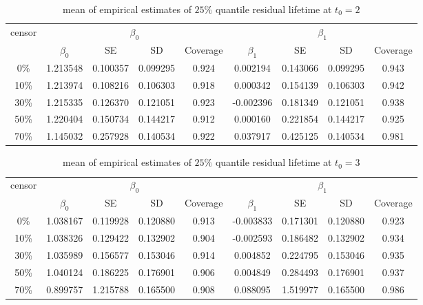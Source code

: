 \documentclass[12pt]{article}
\begin{document}
	\begin{table}[hbt!]
		\caption{mean of empirical estimates of $25\%$ quantile residual lifetime at $t_0=2$}
		\centering
		\begin{tabular}{|c|c|c|c|c|c|c|c|c|}
			\hline
			\multirow{2}{*}{censor} & \multicolumn{4}{c|}{$\beta_0$} & \multicolumn{4}{c|}{$\beta_1$}\\ \cline{2-9}
			& $\beta_0$ & SE & SD  & Coverage  & $\beta_1$ & SE & SD & Coverage\\
			\hline\hline
			0\% & 1.213548 & 0.100357 & 0.099295 & 0.924 & 0.002194 & 0.143066 & 0.099295 & 0.943 \\
			10\% & 1.213974 & 0.108216 & 0.106303 & 0.918 & 0.000342 & 0.154139 & 0.106303 & 0.942 \\
			30\% & 1.215335 & 0.126370 & 0.121051 & 0.923 & -0.002396 & 0.181349 & 0.121051 & 0.938 \\
			50\% & 1.220404 & 0.150734 & 0.144217 & 0.912 & 0.000160 & 0.221854 & 0.144217 & 0.925 \\
			70\% & 1.145032 & 0.257928 & 0.140534 & 0.922 & 0.037917 & 0.425125 & 0.140534 & 0.981 \\ 
			\hline
		\end{tabular}
	\end{table}
	\begin{table}[hbt!]
		\caption{mean of empirical estimates of $25\%$ quantile residual lifetime at $t_0=3$}
		\centering
		\begin{tabular}{|c|c|c|c|c|c|c|c|c|}
			\hline
			\multirow{2}{*}{censor} & \multicolumn{4}{c|}{$\beta_0$} & \multicolumn{4}{c|}{$\beta_1$}\\ \cline{2-9}
			& $\beta_0$ & SE & SD  & Coverage  & $\beta_1$ & SE & SD & Coverage\\
			\hline\hline
			0\% & 1.038167 & 0.119928 & 0.120880 & 0.913 & -0.003833 & 0.171301 & 0.120880 & 0.923 \\
			10\% & 1.038326 & 0.129422 & 0.132902 & 0.904 & -0.002593 & 0.186482 & 0.132902 & 0.934 \\
			30\% & 1.035989 & 0.156577 & 0.153046 & 0.914 & 0.004852 & 0.224795 & 0.153046 & 0.935 \\
			50\% & 1.040124 & 0.186225 & 0.176901 & 0.906 & 0.004849 & 0.284493 & 0.176901 & 0.937 \\
			70\% & 0.899757 & 1.215788 & 0.165500 & 0.908 & 0.088095 & 1.519977 & 0.165500 & 0.986 \\   
			\hline
		\end{tabular}
	\end{table}
\end{document}
